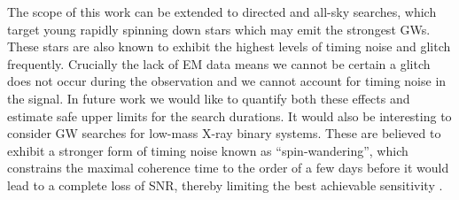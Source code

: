 \documentclass[../full_thesis/full_thesis.tex]{subfiles}
\begin{document}
The scope of this work can be extended to  directed and all-sky searches, which
target young rapidly spinning down stars which may emit the strongest GWs.
These stars are also known to exhibit the highest levels of timing noise and
glitch frequently. Crucially the lack of EM data means we cannot be certain a
glitch does not occur during the observation and we cannot account for timing
noise in the signal.  In future work we would like to quantify both these
effects and estimate safe upper limits for the search durations.
It would also be interesting to consider GW searches for low-mass X-ray binary systems.
These are believed to exhibit a stronger form of timing noise known as
``spin-wandering'', which constrains the maximal coherence time to
the order of a few days before it would lead to a complete loss of
SNR, thereby limiting the best achievable sensitivity
\cite{ligo2015scox1,leaci2015,ScoX1:MDC1}.

\biblio
\end{document}
